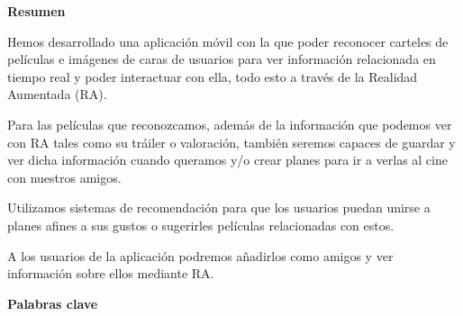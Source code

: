 
\newpage

\thispagestyle{empty}

\begin{center}

{\bf \Huge Resumen}

  \end{center}
\vspace{1cm}

Hemos desarrollado una aplicación móvil con la que poder
 reconocer carteles de películas e imágenes de caras de usuarios para
 ver información relacionada en tiempo real y poder
 interactuar con ella, todo esto a través de la Realidad
 Aumentada (RA).

Para las películas que reconozcamos, además de la información
 que podemos ver con RA tales como su tráiler o valoración,
 también seremos capaces de guardar y ver dicha información
 cuando queramos y/o crear planes para ir a verlas al cine
 con nuestros amigos.

Utilizamos sistemas de recomendación para que los usuarios puedan
 unirse a planes afines a sus gustos o sugerirles películas
 relacionadas con estos.

A los usuarios de la aplicación podremos añadirlos como amigos y ver
 información sobre ellos mediante RA.


\vspace{1cm}


\begin{center}

{\bf \Large Palabras clave}

   \end{center}

   \vspace{0.5cm}
   
